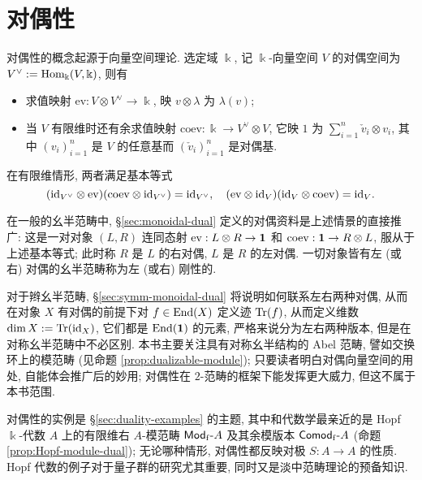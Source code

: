 
\chapter{对偶性}\label{sec:duality}
对偶性的概念起源于向量空间理论. 选定域 $\Bbbk$, 记 $\Bbbk$-向量空间 $V$ 的对偶空间为 $V^\vee := \operatorname{Hom}_{\Bbbk}(V, \Bbbk)$, 则有
\begin{itemize}
	\item 求值映射 $\mathrm{ev}: V \otimes V^\vee \to \Bbbk$, 映 $v \otimes \lambda$ 为 $\lambda(v)$;
	\item 当 $V$ 有限维时还有余求值映射 $\mathrm{coev}: \Bbbk \to V^\vee \otimes V$, 它映 $1$ 为 $\sum_{i=1}^n \check{v}_i \otimes v_i$, 其中 $(v_i)_{i=1}^n$ 是 $V$ 的任意基而 $(\check{v}_i)_{i=1}^n$ 是对偶基.
\end{itemize}
在有限维情形, 两者满足基本等式
\[ (\mathrm{id}_{V^\vee} \otimes \mathrm{ev})(\mathrm{coev} \otimes \mathrm{id}_{V^\vee}) = \mathrm{id}_{V^\vee}, \quad (\mathrm{ev} \otimes \mathrm{id}_V) (\mathrm{id}_V \otimes \mathrm{coev}) = \mathrm{id}_V. \]

在一般的幺半范畴中, \S\ref{sec:monoidal-dual} 定义的对偶资料是上述情景的直接推广: 这是一对对象 $(L, R)$ 连同态射 $\mathrm{ev}: L \otimes R \to \bm{1}$ 和 $\mathrm{coev}: \bm{1} \to R \otimes L$, 服从于上述基本等式; 此时称 $R$ 是 $L$ 的右对偶, $L$ 是 $R$ 的左对偶. 一切对象皆有左 (或右) 对偶的幺半范畴称为左 (或右) 刚性的.

对于辫幺半范畴, \S\ref{sec:symm-monoidal-dual} 将说明如何联系左右两种对偶, 从而在对象 $X$ 有对偶的前提下对 $f \in \operatorname{End}(X)$ 定义迹 $\operatorname{Tr}(f)$, 从而定义维数 $\dim X := \operatorname{Tr}(\mathrm{id}_X)$, 它们都是 $\operatorname{End}(\bm{1})$ 的元素, 严格来说分为左右两种版本, 但是在对称幺半范畴中不必区别. 本书主要关注具有对称幺半结构的 Abel 范畴, 譬如交换环上的模范畴 (见命题 \ref{prop:dualizable-module}); 只要读者明白对偶向量空间的用处, 自能体会推广后的妙用; 对偶性在 $2$-范畴的框架下能发挥更大威力, 但这不属于本书范围.

对偶性的实例是 \S\ref{sec:duality-examples} 的主题, 其中和代数学最亲近的是 Hopf $\Bbbk$-代数 $A$ 上的有限维右 $A$-模范畴 $\mathsf{Mod}_{\mathrm{f}}\text{-}A$ 及其余模版本 $\mathsf{Comod}_{\mathrm{f}}\text{-}A$ (命题 \ref{prop:Hopf-module-dual}); 无论哪种情形, 对偶性都反映对极 $S: A \to A$ 的性质. Hopf 代数的例子对于量子群的研究尤其重要, 同时又是淡中范畴理论的预备知识.

